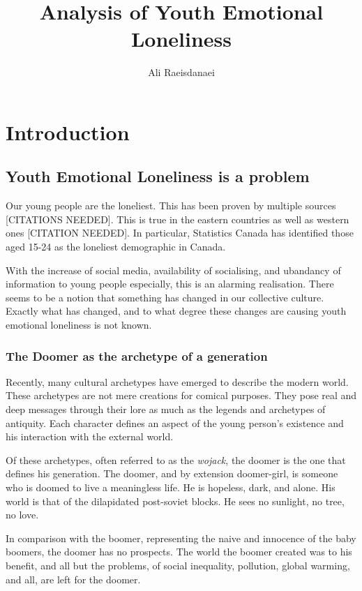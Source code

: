 \documentclass{article}
\begin{document}

\title{Analysis of Youth Emotional Loneliness}
\author{Ali Raeisdanaei}
\maketitle

\section{Introduction}
\subsection{Youth Emotional Loneliness is a problem}
Our young people are the loneliest. This has been proven by multiple sources [CITATIONS NEEDED]. 
This is true in the eastern countries as well as western ones [CITATION NEEDED].
In particular, Statistics Canada has identified those aged 15-24 as the loneliest demographic in Canada. 

With the increase of social media, availability of socialising, and ubandancy of information to young people especially, this is an alarming realisation. 
There seems to be a notion that something has changed in our collective culture. 
Exactly what has changed, and to what degree these changes are causing youth emotional loneliness is not known. 

\subsubsection{The Doomer as the archetype of a generation}

Recently, many cultural archetypes have emerged to describe the modern world. 
These archetypes are not mere creations for comical purposes. They pose real and deep messages through their lore as much as the legends and archetypes of antiquity.
Each character defines an aspect of the young person's existence and his interaction with the external world. 

Of these archetypes, often referred to as the \textit{wojack}, the doomer is the one that defines his generation.
The doomer, and by extension doomer-girl, is someone who is doomed to live a meaningless life. 
He is hopeless, dark, and alone. His world is that of the dilapidated post-soviet blocks. He sees no sunlight, no tree, no love. 

In comparison with the boomer, representing the naive and innocence of the baby boomers, the doomer has no prospects. 
The world the boomer created was to his benefit, and all but the problems, of social inequality, pollution, global warming, and all, are left for the doomer. 
\end{document}
